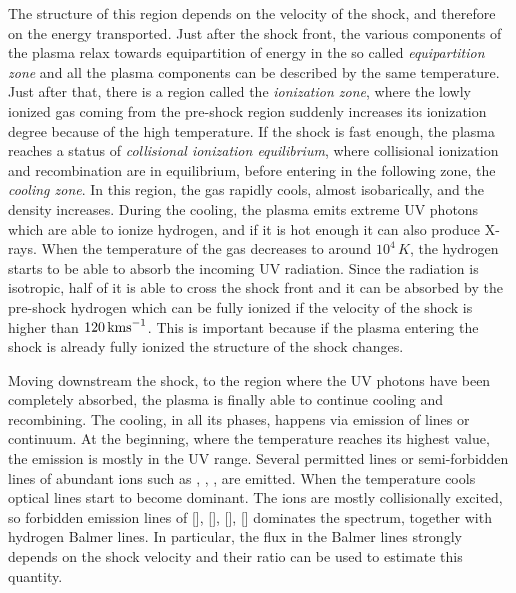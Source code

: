 \documentclass[../main.tex]{subfiles}
\begin{document}
The structure of this region depends on the velocity of the shock, and therefore on the energy transported.
Just after the shock front, the various components of the plasma relax towards equipartition of energy in the so called \emph{equipartition zone} and all the plasma components can be described by the same temperature.
Just after that, there is a region called the \emph{ionization zone}, where the lowly ionized gas coming from the pre-shock region suddenly increases its ionization degree because of the high temperature. 
If the shock is fast enough, the plasma reaches a status of \emph{collisional ionization equilibrium}, where collisional ionization and recombination are in equilibrium, before entering in the following zone, the \emph{cooling zone}.
In this region, the gas rapidly cools, almost isobarically, and the density increases.
During the cooling, the plasma emits extreme UV photons which are able to ionize hydrogen, and if it is hot enough it can also produce X-rays.
When the temperature of the gas decreases to around $10^4\,\si{K}$, the hydrogen starts to be able to absorb the incoming UV radiation.
Since the radiation is isotropic, half of it is able to cross the shock front and it can be absorbed by the pre-shock hydrogen which can be fully ionized if the velocity of the shock is higher than $120\,\si{\kms}$.
This is important because if the plasma entering the shock is already fully ionized the structure of the shock changes.

Moving downstream the shock, to the region where the UV photons have been completely absorbed, the plasma is finally able to continue cooling and recombining.
The cooling, in all its phases, happens via emission of lines or continuum.
At the beginning, where the temperature reaches its highest value, the emission is mostly in the UV range.
Several permitted lines or semi-forbidden lines of abundant ions such as , , ,  are emitted.
When the temperature cools optical lines start to become dominant.
The ions are mostly collisionally excited, so forbidden emission lines of [], [], [], [] dominates the spectrum, together with hydrogen Balmer lines.
In particular, the flux in the Balmer lines strongly depends on the shock velocity and their ratio can be used to estimate this quantity.







\biblio
\end{document}
